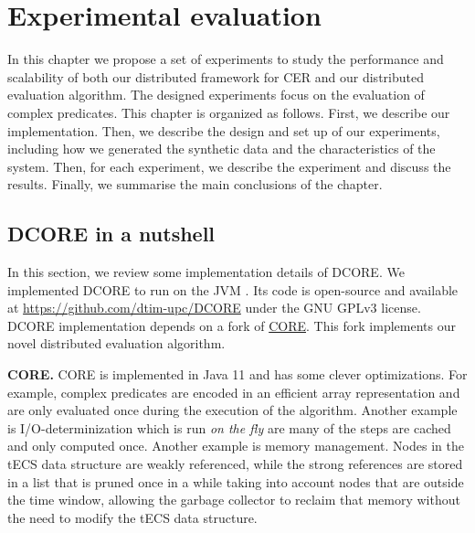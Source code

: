 \chapter{Experimental evaluation}\label{chapter:experimental_evaluation}

In this chapter we propose a set of experiments to study the performance and scalability of both our distributed framework for CER and our distributed evaluation algorithm. The designed experiments focus on the evaluation of complex predicates. This chapter is organized as follows. First, we describe our implementation. Then, we describe the design and set up of our experiments, including how we generated the synthetic data and the characteristics of the system. Then, for each experiment, we describe the experiment and discuss the results. Finally, we summarise the main conclusions of the chapter.

\section{DCORE in a nutshell}\label{chapter:dcore}

In this section, we review some implementation details of DCORE. We implemented DCORE to run on the JVM \cite{jvm}. Its code is open-source and available at \url{https://github.com/dtim-upc/DCORE} under the GNU GPLv3 license. DCORE implementation depends on a fork of \href{https://github.com/dtim-upc/CORE2/tree/distributed_enumeration}{CORE}. This fork implements our novel distributed evaluation algorithm.

\textbf{CORE.} CORE is implemented in Java 11 and has some clever optimizations. For example, complex predicates are encoded in an efficient array representation and are only evaluated once during the execution of the algorithm. Another example is I/O-determinization which is run \emph{on the fly} are many of the steps are cached and only computed once. Another example is memory management. Nodes in the tECS data structure are weakly referenced, while the strong references are stored in a list that is pruned once in a while taking into account nodes that are outside the time window, allowing the garbage collector to reclaim that memory without the need to modify the tECS data structure.


